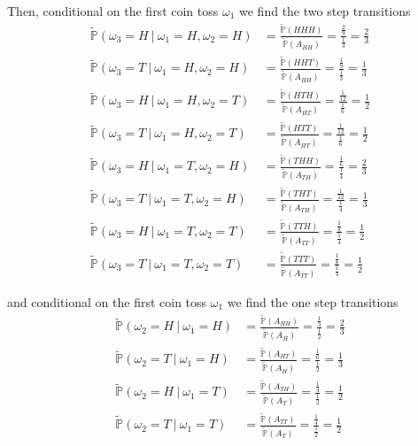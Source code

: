 \documentclass[12pt]{article}
\renewcommand{\P}{\mathbb P}
\begin{document}
Then, conditional on the first coin toss $\omega_1$ we find the two step transitions
\begin{align*}
	\tilde{\P}(\omega_3 = H~|~\omega_1 = H,\omega_2 = H) &= \frac{ \tilde{\P}(HHH) }{ \tilde{\P}(A_{HH}) } = \frac{ \frac{2}{9} }{ \frac{1}{3} } = \frac{2}{3}	 \\
	\tilde{\P}(\omega_3 = T~|~\omega_1 = H,\omega_2 = H) &= \frac{ \tilde{\P}(HHT) }{ \tilde{\P}(A_{HH}) } = \frac{ \frac{1}{9} }{ \frac{1}{3} } = \frac{1}{3} \\
	\tilde{\P}(\omega_3 = H~|~\omega_1 = H,\omega_2 = T) &= \frac{ \tilde{\P}(HTH) }{ \tilde{\P}(A_{HT}) } = \frac{ \frac{1}{12} }{ \frac{1}{6} } = \frac{1}{2} \\
	\tilde{\P}(\omega_3 = T~|~\omega_1 = H,\omega_2 = T) &= \frac{ \tilde{\P}(HTT) }{ \tilde{\P}(A_{HT}) } = \frac{ \frac{1}{12} }{ \frac{1}{6} } = \frac{1}{2} \\
	\tilde{\P}(\omega_3 = H~|~\omega_1 = T,\omega_2 = H) &= \frac{ \tilde{\P}(THH) }{ \tilde{\P}(A_{TH}) } = \frac{ \frac{1}{6} }{ \frac{1}{4} } = \frac{2}{3} \\
	\tilde{\P}(\omega_3 = T~|~\omega_1 = T,\omega_2 = H) &= \frac{ \tilde{\P}(THT) }{ \tilde{\P}(A_{TH}) } = \frac{ \frac{1}{12} }{ \frac{1}{4} } = \frac{1}{3}	 \\
	\tilde{\P}(\omega_3 = H~|~\omega_1 = T,\omega_2 = T) &= \frac{ \tilde{\P}(TTH) }{ \tilde{\P}(A_{TT}) } = \frac{ \frac{1}{8} }{ \frac{1}{4} } = \frac{1}{2}	\\
	\tilde{\P}(\omega_3 = T~|~\omega_1 = T,\omega_2 = T) &= \frac{ \tilde{\P}(TTT) }{ \tilde{\P}(A_{TT}) } = \frac{ \frac{1}{8} }{ \frac{1}{4} } = \frac{1}{2}
\end{align*}

and conditional on the first coin toss $\omega_1$ we find the one step transitions
\begin{align*}
	\tilde{\P}(\omega_2 = H~|~\omega_1 = H) &= \frac{ \tilde{\P}(A_{HH}) }{ \tilde{\P}(A_{H}) } = \frac{ \frac{1}{3} }{ \frac{1}{2} } = \frac{2}{3} \\
	\tilde{\P}(\omega_2 = T~|~\omega_1 = H) &= \frac{ \tilde{\P}(A_{HT}) }{ \tilde{\P}(A_{H}) } = \frac{ \frac{1}{6} }{ \frac{1}{2} } = \frac{1}{3} \\
	\tilde{\P}(\omega_2 = H~|~\omega_1 = T) &= \frac{ \tilde{\P}(A_{TH}) }{ \tilde{\P}(A_{T}) } = \frac{ \frac{1}{4} }{ \frac{1}{2} } = \frac{1}{2} \\
	\tilde{\P}(\omega_2 = T~|~\omega_1 = T) &= \frac{ \tilde{\P}(A_{TT}) }{ \tilde{\P}(A_{T}) } = \frac{ \frac{1}{4} }{ \frac{1}{2} } = \frac{1}{2}		
\end{align*}
\end{document}
